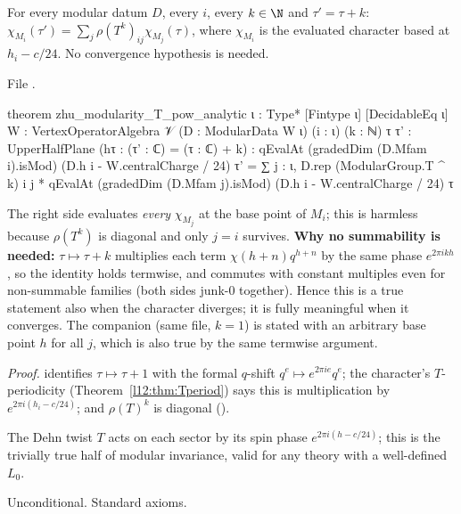 \begin{theorem}\label{l14:thm:Tanalytic}
For every modular datum $D$, every $i$, every $k\in\N$ and $\tau'=\tau+k$:
$\chi_{M_i}(\tau') = \sum_j\rho(T^k)_{ij}\chi_{M_j}(\tau)$, where $\chi_{M_i}$ is the evaluated character based at
$h_i - c/24$. No convergence hypothesis is needed.
\end{theorem}
\noindent File .
\begin{leancode}
theorem zhu_modularity_T_pow_analytic {ι : Type*} [Fintype ι] [DecidableEq ι]
    {W : VertexOperatorAlgebra 𝒱} (D : ModularData W ι) (i : ι) (k : ℕ)
    {τ τ' : UpperHalfPlane} (hτ : (τ' : ℂ) = (τ : ℂ) + k) :
    qEvalAt (gradedDim (D.Mfam i).isMod) (D.h i - W.centralCharge / 24) τ'
      = ∑ j : ι, D.rep (ModularGroup.T ^ k) i j
          * qEvalAt (gradedDim (D.Mfam j).isMod) (D.h i - W.centralCharge / 24) τ
\end{leancode}
\begin{dictionary}
The right side evaluates \emph{every} $\chi_{M_j}$ at the base point of $M_i$; this is harmless because $\rho(T^k)$ is
diagonal and only $j=i$ survives. \textbf{Why no summability is needed:} $\tau\mapsto\tau+k$ multiplies each term
$\chi(h+n)q^{h+n}$ by the same phase $e^{2\pi ikh}$, so the identity holds termwise, and  commutes with constant
multiples even for non-summable families (both sides junk-$0$ together). Hence this is a true statement also when the
character diverges; it is fully meaningful when it converges. The companion  (same file, $k=1$)
is stated with an arbitrary base point $h$ for all $j$, which is also true by the same termwise argument.
\end{dictionary}
\noindent\emph{Proof.}  identifies $\tau\mapsto\tau+1$ with the formal $q$-shift $q^e\mapsto
e^{2\pi ie}q^e$; the character's $T$-periodicity (Theorem~\ref{l12:thm:Tperiod}) says this is multiplication by
$e^{2\pi i(h_i-c/24)}$; and $\rho(T)^k$ is diagonal ().
\begin{physics}
The Dehn twist $T$ acts on each sector by its spin phase $e^{2\pi i(h-c/24)}$; this is the trivially true half of modular
invariance, valid for any theory with a well-defined $L_0$.
\end{physics}
\begin{status}
Unconditional. Standard axioms.
\end{status}

